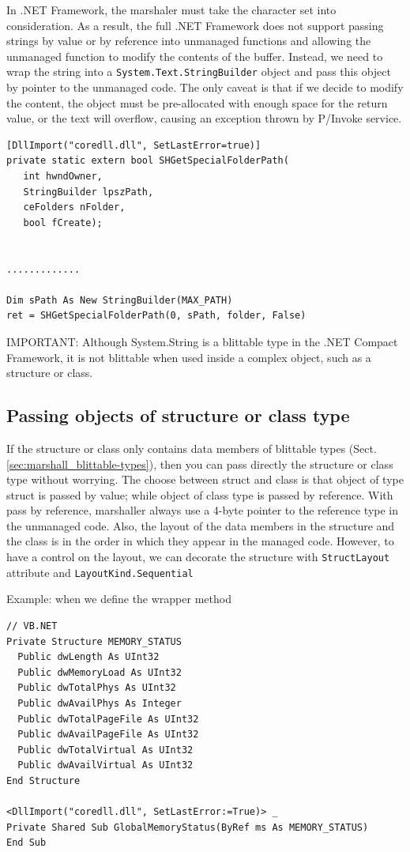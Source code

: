 In .NET Framework, the marshaler must take the character set into consideration.
As a result, the full .NET Framework does not support passing strings by value
or by reference into unmanaged functions and allowing the unmanaged function to
modify the contents of the buffer. Instead, we need to wrap the string into a
\verb!System.Text.StringBuilder! object and pass this object by pointer to the
unmanaged code. The only caveat is that if we decide to modify the content, the
object must be pre-allocated with enough space for the return value, or the text
will overflow, causing an exception thrown by P/Invoke service.

\begin{verbatim}
[DllImport("coredll.dll", SetLastError=true)]
private static extern bool SHGetSpecialFolderPath(
   int hwndOwner, 
   StringBuilder lpszPath,
   ceFolders nFolder,
   bool fCreate);


.............

Dim sPath As New StringBuilder(MAX_PATH)
ret = SHGetSpecialFolderPath(0, sPath, folder, False)
\end{verbatim}
 
IMPORTANT: Although System.String is a blittable type in the .NET Compact
Framework, it is not blittable when used inside a complex object, such as a
structure or class.

\subsection{Passing objects of structure or class type}

If the structure or class only contains data members of blittable types
(Sect.\ref{sec:marshall_blittable-types}), then you can pass directly the
structure or class type without worrying. The choose between struct and class is
that object of type struct is passed by value; while object of class type is
passed by reference. With pass by reference, marshaller always use a 4-byte
pointer to the reference type in the unmanaged code. Also, the layout of the
data members in the structure and the class is in the order in which they appear
in the managed code. However, to have a control on the layout, we can 
decorate the structure with \verb!StructLayout! attribute and
\verb!LayoutKind.Sequential! 

Example: when we define the wrapper method
\begin{verbatim}
// VB.NET
Private Structure MEMORY_STATUS
  Public dwLength As UInt32
  Public dwMemoryLoad As UInt32
  Public dwTotalPhys As UInt32
  Public dwAvailPhys As Integer
  Public dwTotalPageFile As UInt32
  Public dwAvailPageFile As UInt32
  Public dwTotalVirtual As UInt32
  Public dwAvailVirtual As UInt32
End Structure

<DllImport("coredll.dll", SetLastError:=True)> _
Private Shared Sub GlobalMemoryStatus(ByRef ms As MEMORY_STATUS)
End Sub
\end{verbatim}

